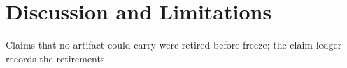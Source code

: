 \section{Discussion and Limitations}
\label{sec:discussion}
Claims that no artifact could carry were retired before freeze; the claim ledger records the retirements.

